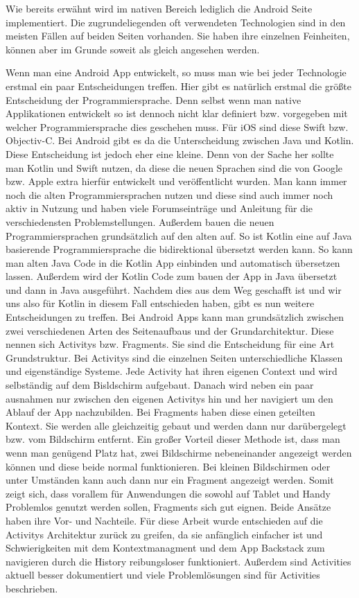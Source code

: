 Wie bereits erwähnt wird im nativen Bereich lediglich die Android Seite implementiert. Die zugrundeliegenden oft verwendeten Technologien sind in den meisten Fällen auf beiden Seiten vorhanden. Sie haben ihre einzelnen Feinheiten, können aber im Grunde soweit als gleich angesehen werden.

Wenn man eine Android App entwickelt, so muss man wie bei jeder Technologie erstmal ein paar Entscheidungen treffen. Hier gibt es natürlich erstmal die größte Entscheidung der Programmiersprache. Denn selbst wenn man native Applikationen entwickelt so ist dennoch nicht klar definiert bzw. vorgegeben mit welcher Programmiersprache dies geschehen muss. Für iOS sind diese Swift bzw. Objectiv-C. Bei Android gibt es da die Unterscheidung zwischen Java und Kotlin. Diese Entscheidung ist jedoch eher eine kleine. Denn von der Sache her sollte man Kotlin und Swift nutzen, da diese die neuen Sprachen sind die von Google bzw. Apple extra hierfür entwickelt und veröffentlicht wurden. Man kann immer noch die alten Programmiersprachen nutzen und diese sind auch immer noch aktiv in Nutzung und haben viele Forumseinträge und Anleitung für die verschiedensten Problemstellungen. Außerdem bauen die neuen Programmiersprachen grundsätzlich auf den alten auf. So ist Kotlin eine auf Java basierende Programmiersprache die bidirektional übersetzt werden kann. So kann man alten Java Code in die Kotlin App einbinden und automatisch übersetzen lassen. Außerdem wird der Kotlin Code zum bauen der App in Java übersetzt und dann in Java ausgeführt.
Nachdem dies aus dem Weg geschafft ist und wir uns also für Kotlin in diesem Fall entschieden haben, gibt es nun weitere Entscheidungen zu treffen. Bei Android Apps kann man grundsätzlich zwischen zwei verschiedenen Arten des Seitenaufbaus und der Grundarchitektur. 
Diese nennen sich Activitys bzw. Fragments. Sie sind die Entscheidung für eine Art Grundstruktur. Bei Activitys sind die einzelnen Seiten unterschiedliche Klassen und eigenständige Systeme. Jede Activity hat ihren eigenen Context und wird selbständig auf dem Bisldschirm aufgebaut. Danach wird neben ein paar ausnahmen nur zwischen den eigenen Activitys hin und her navigiert um den Ablauf der App nachzubilden.
Bei Fragments haben diese einen geteilten Kontext. Sie werden alle gleichzeitig gebaut und werden dann nur darübergelegt bzw. vom Bildschirm entfernt. Ein großer Vorteil dieser Methode ist, dass man wenn man genügend Platz hat, zwei Bildschirme nebeneinander angezeigt werden können und diese beide normal funktionieren. Bei kleinen Bildschirmen oder unter Umständen kann auch dann nur ein Fragment angezeigt werden. Somit zeigt sich, dass vorallem für Anwendungen die sowohl auf Tablet und Handy Problemlos genutzt werden sollen, Fragments sich gut eignen.
Beide Ansätze haben ihre Vor- und Nachteile.
Für diese Arbeit wurde entschieden auf die Activitys Architektur zurück zu greifen, da sie anfänglich einfacher ist und Schwierigkeiten mit dem Kontextmanagment und dem App Backstack zum navigieren durch die History reibungsloser funktioniert. Außerdem sind Activities aktuell besser dokumentiert und viele Problemlösungen sind für Activities beschrieben.

